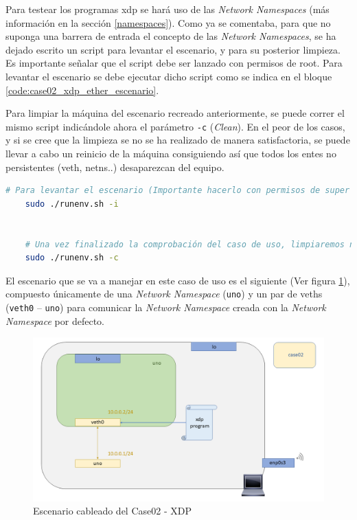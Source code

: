Para testear los programas \gls{xdp} se hará uso de las \textit{Network Namespaces} (más información en la sección \ref{namespaces}). Como ya se comentaba, para que no suponga una barrera de entrada el concepto de las \textit{Network Namespaces}, se ha dejado escrito un script para levantar el escenario, y para su posterior limpieza. Es importante señalar que el script debe ser lanzado con permisos de root. Para levantar el escenario se debe ejecutar dicho script como se indica en el bloque \ref{code:case02_xdp_ether_escenario}.\\
\par
Para limpiar la máquina del escenario recreado anteriormente, se puede correr el mismo script indicándole ahora el parámetro \texttt{-c} (\textit{Clean}). En el peor de los casos, y si se cree que la limpieza se no se ha realizado de manera satisfactoria, se puede llevar a cabo un reinicio de la máquina consiguiendo así que todos los entes no persistentes (\gls{veth}, netns..) desaparezcan del equipo.

\begin{lstlisting}[language= bash, style=Consola, caption={Puesta en marcha del escenario - Case02},label=code:case02_xdp_ether_escenario]
    # Para levantar el escenario (Importante hacerlo con permisos de super usuario)
    sudo ./runenv.sh -i
    
    
    # Una vez finalizado la comprobación del caso de uso, limpiaremos nuestra maquina:
    sudo ./runenv.sh -c
\end{lstlisting}
\vspace{0.5cm}

El escenario que se va a manejar en este caso de uso es el siguiente (Ver figura \ref{fig:case02_xdp_ether_scenario}), compuesto únicamente de una \textit{Network Namespace} (\texttt{uno}) y un par de \gls{veth}s (\texttt{veth0} -- \texttt{uno}) para comunicar la \textit{Network Namespace} creada con la \textit{Network Namespace} por defecto.

\newpage

\begin{figure}[ht]
    \centering
    \includegraphics[width=16cm]{archivos/img/dev/xdp/case02/scenario.png}
    \caption{Escenario cableado del Case02 - XDP}
    \label{fig:case02_xdp_ether_scenario}
\end{figure}

